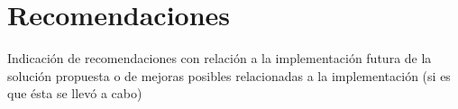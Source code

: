 \chapter{Recomendaciones}
Indicación de recomendaciones con relación a la
implementación futura de la solución propuesta o
de mejoras posibles relacionadas a la
implementación (si es que ésta se llevó a cabo)